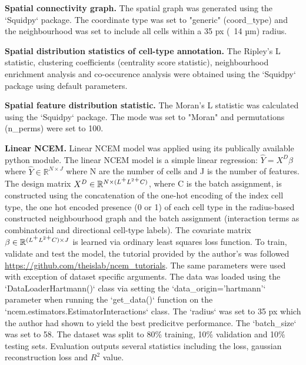 \textbf{Spatial connectivity graph.} The spatial graph was generated using the `Squidpy` package. The coordinate type was set to "generic" (coord\_type) and the neighbourhood was set to include all cells within a 35 px (~14 µm) radius.

\textbf{Spatial distribution statistics of cell-type annotation.} The Ripley's L statistic, clustering coefficients (centrality score statistic), neighbourhood enrichment analysis and co-occurence analysis were obtained using the `Squidpy` package using default parameters.

\textbf{Spatial feature distribution statistic.} The Moran's L statistic was calculated using the `Squidpy` package. The mode was set to "Moran" and  permutations (n\_perms) were set to 100.

\textbf{Linear NCEM.}  Linear NCEM model was applied using its publically available python module. The linear NCEM model is a simple linear regression: $\hat{Y} = X^D \beta$ where $\hat{Y} \in \mathbb{R}^{N \times J}$ where N are the number of cells and J is the number of features. The design matrix  $X^D \in \mathbb{R}^{N \times (L \textsuperscript{+} L^2 \textsuperscript{+} C)}$, where C is the batch assignment, is constructed using the concatenation of the one-hot encoding of the index cell type, the one hot encoded presence (0 or 1) of each cell type in the radius-based constructed neighbourhood graph and the batch assignment (interaction terms as combinatorial and directional cell-type labels). The covariate matrix $\beta \in \mathbb{R}^{(L \textsuperscript{+} L^2 \textsuperscript{+} C) \times J}$ is learned via ordinary least squares loss function. To train, validate and test the model, the tutorial provided by the author's was followed \url{https://github.com/theislab/ncem_tutorials}. The same parameters were used with exception of dataset specific arguments. The data was loaded using the `DataLoaderHartmann()` class via setting the `data\_origin='hartmann'` parameter when running the `get\_data()` function on the `ncem.estimators.EstimatorInteractions` class. The `radius` was set to 35 px which the author had shown to yield the best predicitve performance. The `batch\_size` was set to 58. The dataset was split to 80\% training, 10\% validation and 10\% testing sets. Evaluation outputs several statistics including the loss, gaussian reconstruction loss and $R^2$ value.


